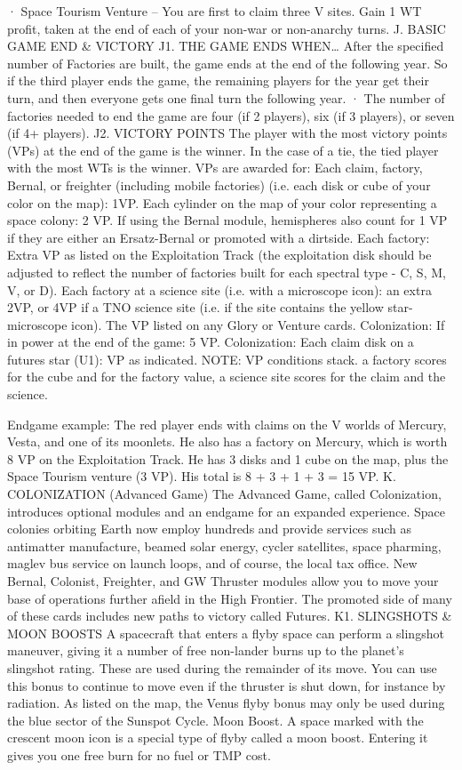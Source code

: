 \documentclass[a4paper]{book}
\begin{document}
·       Space Tourism Venture – You are first to claim three V sites. Gain 1 WT profit, taken at the end of each of your non-war or non-anarchy turns.
J. BASIC GAME END \& VICTORY
J1. THE GAME ENDS WHEN…
After the specified number of Factories are built, the game ends at the end of the following year. So if the third player ends the game, the remaining players for the year get their turn, and then everyone gets one final turn the following year.
·       The number of factories needed to end the game are four (if 2 players), six (if 3 players), or seven (if 4+ players).
J2. VICTORY POINTS
The player with the most victory points (VPs) at the end of the game is the winner. In the case of a tie, the tied player with the most WTs is the winner. VPs are awarded for:
Each claim, factory, Bernal, or freighter (including mobile factories) (i.e. each disk or cube of your color on the map): 1VP. Each cylinder on the map of your color representing a space colony: 2 VP. If using the Bernal module, hemispheres also count for 1 VP if they are either an  Ersatz-Bernal or promoted with a dirtside.
Each factory: Extra VP as listed on the Exploitation Track (the exploitation disk should be adjusted to reflect the number of factories built for each spectral type - C, S, M, V, or D).
Each factory at a science site (i.e. with a microscope icon): an extra 2VP, or 4VP if a TNO science site (i.e. if the site contains the yellow star-microscope icon).
The VP listed on any Glory or Venture cards.
Colonization: If in power at the end of the game: 5 VP.
 Colonization: Each claim disk on a futures star (U1): VP as indicated.
NOTE: VP conditions stack. a factory scores for the cube and for the factory value, a science site scores for the claim and the science.

Endgame example: The red player ends with claims on the V worlds of Mercury, Vesta, and one of its moonlets. He also has a factory on Mercury, which is worth 8 VP on the Exploitation Track. He has 3 disks and 1 cube on the map, plus the Space Tourism venture (3 VP). His total is 8 + 3 + 1 + 3 = 15 VP.
K. COLONIZATION (Advanced Game)
The Advanced Game, called Colonization, introduces optional modules and an endgame for an expanded experience.
Space colonies orbiting Earth now employ hundreds and provide services such as antimatter manufacture, beamed solar energy, cycler satellites, space pharming, maglev bus service on launch loops, and of course, the local tax office. New Bernal, Colonist, Freighter, and GW Thruster modules allow you to move your base of operations further afield in the High Frontier. The promoted side of many of these cards includes new paths to victory called Futures.
K1. SLINGSHOTS \& MOON BOOSTS
A spacecraft that enters a flyby space can perform a slingshot maneuver, giving it a number of free non-lander burns up to the planet’s slingshot rating. These are used during the remainder of its move. You can use this bonus to continue to move even if the thruster is shut down, for instance by radiation.
As listed on the map, the Venus flyby bonus may only be used during the blue sector of the Sunspot Cycle.
Moon Boost. A space marked with the crescent moon icon is a special type of flyby called a moon boost. Entering it gives you one free burn for no fuel or TMP cost.
\end{document}
